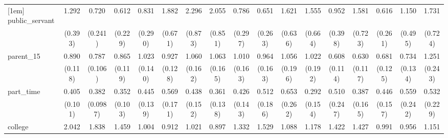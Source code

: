{\begin{tabular}{l*{16}{c}}
[1em]
public\_servant      &       1.292         &       0.720         &       0.612         &       0.831         &       1.882         &       2.296\sym{*}  &       2.055         &       0.786         &       0.651         &       1.621         &       1.555         &       0.952         &       1.581         &       0.616         &       1.150         &       1.731         \\
                    &     (0.393)         &     (0.241)         &     (0.229)         &     (0.290)         &     (0.671)         &     (0.873)         &     (0.851)         &     (0.297)         &     (0.263)         &     (0.636)         &     (0.664)         &     (0.398)         &     (0.723)         &     (0.261)         &     (0.495)         &     (0.724)         \\
[1em]
parent\_15           &       0.890         &       0.787         &       0.865         &       1.023         &       0.927         &       1.060         &       1.063         &       1.010         &       0.964         &       1.056         &       1.022         &       0.608\sym{**} &       0.630\sym{*}  &       0.681\sym{*}  &       0.734         &       1.251         \\
                    &     (0.118)         &     (0.106)         &     (0.119)         &     (0.140)         &     (0.128)         &     (0.162)         &     (0.165)         &     (0.163)         &     (0.163)         &     (0.196)         &     (0.192)         &     (0.114)         &     (0.117)         &     (0.125)         &     (0.134)         &     (0.243)         \\
[1em]
part\_time           &       0.405\sym{***}&       0.382\sym{***}&       0.352\sym{***}&       0.445\sym{**} &       0.569         &       0.438\sym{*}  &       0.361\sym{**} &       0.426\sym{*}  &       0.512         &       0.653         &       0.292\sym{*}  &       0.510         &       0.387\sym{*}  &       0.446\sym{*}  &       0.559         &       0.532         \\
                    &     (0.101)         &    (0.0987)         &     (0.103)         &     (0.139)         &     (0.171)         &     (0.152)         &     (0.138)         &     (0.143)         &     (0.186)         &     (0.262)         &     (0.154)         &     (0.247)         &     (0.165)         &     (0.157)         &     (0.242)         &     (0.229)         \\
[1em]
college             &       2.042\sym{***}&       1.838\sym{**} &       1.459         &       1.004         &       0.912         &       1.021         &       0.897         &       1.332         &       1.529         &       1.088         &       1.178         &       1.422         &       1.427         &       0.991         &       0.956         &       1.151         \\

\end{tabular}}
